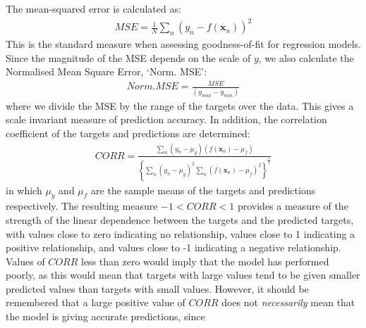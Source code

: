 The mean-squared error is calculated as:
\begin{equation}
\begin{aligned}
MSE=\frac{1}{N}\sum_{n} (y_n-f(\mathbf{x}_n))^2
\end{aligned}
\end{equation}
This is the standard measure when assessing goodness-of-fit for regression models. 
Since the magnitude of the MSE depends on the scale of $y$, we also calculate the Normalised Mean Square Error, `Norm. MSE':
\begin{equation}
\begin{aligned}
Norm. MSE=\frac{MSE}{(y_{max}-y_{min})}
\end{aligned}
\end{equation}
where we divide the MSE by the range of the targets over the 
data. This gives a scale invariant measure of prediction accuracy.
In addition, the correlation coefficient of the targets and predictions are determined:
\begin{equation}
\begin{aligned}
CORR=\frac{\sum_{n} (y_n-\mu_y) (f(\boldsymbol{x}_n)-\mu_f)}{\left\{\sum_{n} (y_n-\mu_y)^2 \sum_{n} (f(\boldsymbol{x}_n)-\mu_f)^2\right\}^\frac{1}{2}}
\end{aligned}
\end{equation}
in which $\mu_y$ and $\mu_f$ are the sample means of the targets and predictions respectively. The resulting measure $-1<CORR<1$ provides a measure of the strength of the linear dependence between the targets and the predicted targets, with values close to zero indicating no relationship, values close to 1 indicating a positive relationship, and values close to -1 indicating a negative relationship. Values of $CORR$ less than zero would imply that the model has performed poorly, as this would mean that targets with large values tend to be given smaller predicted values than targets with small values. However, it should be remembered that a large positive value of $CORR$ does not \emph{necessarily} mean that the model is giving accurate predictions, since 
